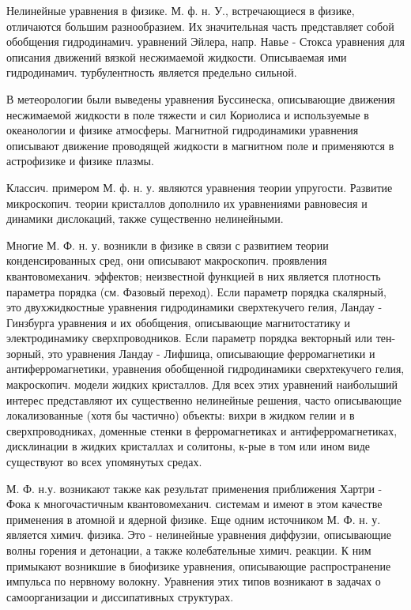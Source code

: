 \documentclass[10pt]{article}
\begin{document}
Нелинейные уравнения в физике. М. ф. н. У., встречающиеся в физике, отличаются большим разнообразием. Их значительная часть представляет собой обобщения гидродинамич. уравнений Эйлера, напр. Навье - Стокса уравнения для описания движений вязкой несжимаемой жидкости. Описываемая ими гидродинамич. турбулентность является предельно сильной.



В метеорологии были выведены уравнения Буссинеска, описывающие движения несжимаемой жидкости в поле тяжести и сил Кориолиса и используемые в океанологии и физике атмосферы. Магнитной гидродинамики уравнения описывают движение проводящей жидкости в магнитном поле и применяются в астрофизике и физике плазмы.



Классич. примером М. ф. н. у. являются уравнения теории упругости. Развитие микроскопич. теории кристаллов дополнило их уравнениями равновесия и динамики дислокаций, также существенно нелинейными.



Многие М. Ф. н. у. возникли в физике в связи с развитием теории конденсированных сред, они описывают макроскопич. проявления квантовомеханич. эффектов; неизвестной функцией в них является плотность параметра порядка (см. Фазовый переход). Если параметр порядка скалярный, это двухжидкостные уравнения гидродинамики сверхтекучего гелия, Ландау - Гинзбурга уравнения и их обобщения, описывающие магнитостатику и электродинамику сверхпроводников. Если параметр порядка векторный или тен- зорный, это уравнения Ландау - Лифшица, описывающие ферромагнетики и антиферромагнетики, уравнения обобщенной гидродинамики сверхтекучего гелия, макроскопич. модели жидких кристаллов. Для всех этих уравнений наиболыший интерес представляют их существенно нелинейные решения, часто описывающие локализованные (хотя бы частично) объекты: вихри в жидком гелии и в сверхпроводниках, доменные стенки в ферромагнетиках и антиферромагнетиках, дисклинации в жидких кристаллах и солитоны, к-рые в том или ином виде существуют во всех упомянутых средах.



М. Ф. н.у. возникают также как результат применения приближения Хартри - Фока к многочастичным квантовомеханич. системам и имеют в этом качестве применения в атомной и ядерной физике. Еще одним источником М. Ф. н. у. является химич. физика. Это - нелинейные уравнения диффузии, описывающие волны горения и детонации, а также колебательные химич. реакции. К ним примыкают возникшие в биофизике уравнения, описывающие распространение импульса по нервному волокну. Уравнения этих типов возникают в задачах о самоорганизации и диссипативных структурах.
\end{document}
